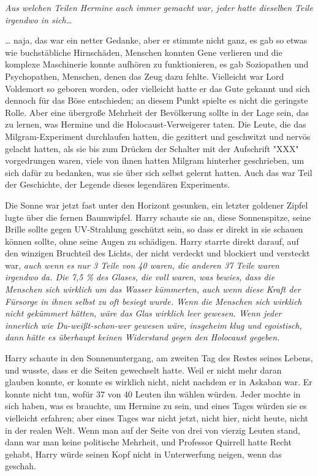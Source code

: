 {\emph{Aus welchen Teilen Hermine auch immer gemacht war, jeder hatte dieselben Teile irgendwo in sich…}

… naja, das war ein netter Gedanke, aber er stimmte nicht ganz, es gab so etwas wie buchstäbliche Hirnschäden, Menschen konnten Gene verlieren und die komplexe Maschinerie konnte aufhören zu funktionieren, es gab Soziopathen und Psychopathen, Menschen, denen das Zeug dazu fehlte. Vielleicht war Lord Voldemort so geboren worden, oder vielleicht hatte er das Gute gekannt und sich dennoch für das Böse entschieden; an diesem Punkt spielte es nicht die geringste Rolle. Aber eine übergroße Mehrheit der Bevölkerung sollte in der Lage sein, das zu lernen, was Hermine und die Holocaust-Verweigerer taten. Die Leute, die das Milgram-Experiment durchlaufen hatten, die gezittert und geschwitzt und nervös gelacht hatten, als sie bis zum Drücken der Schalter mit der Aufschrift "XXX" vorgedrungen waren, viele von ihnen hatten Milgram hinterher geschrieben, um sich dafür zu bedanken, was sie über sich selbst gelernt hatten. Auch das war Teil der Geschichte, der Legende dieses legendären Experiments.

Die Sonne war jetzt fast unter den Horizont gesunken, ein letzter goldener Zipfel lugte über die fernen Baumwipfel. Harry schaute sie an, diese Sonnenspitze, seine Brille sollte gegen UV-Strahlung geschützt sein, so dass er direkt in sie schauen können sollte, ohne seine Augen zu schädigen. Harry starrte direkt darauf, auf den winzigen Bruchteil des Lichts, der nicht verdeckt und blockiert und versteckt war, \emph{auch wenn es nur 3 Teile von 40 waren, die anderen 37 Teile waren irgendwo da. Die 7,5 \% des Glases, die voll waren, was bewies, dass die Menschen sich wirklich um das Wasser kümmerten, auch wenn diese Kraft der Fürsorge in ihnen selbst zu oft besiegt wurde. Wenn die Menschen sich wirklich nicht gekümmert hätten, wäre das Glas wirklich leer gewesen. Wenn jeder innerlich wie Du-weißt-schon-wer gewesen wäre, insgeheim klug und egoistisch, dann hätte es überhaupt keinen Widerstand gegen den Holocaust gegeben.}

Harry schaute in den Sonnenuntergang, am zweiten Tag des Restes seines Lebens, und wusste, dass er die Seiten gewechselt hatte. Weil er nicht mehr daran glauben konnte, er konnte es wirklich nicht, nicht nachdem er in Askaban war. Er konnte nicht tun, wofür 37 von 40 Leuten ihn wählen würden. Jeder mochte in sich haben, was es brauchte, um Hermine zu sein, und eines Tages würden sie es vielleicht erfahren; aber eines Tages war nicht jetzt, nicht hier, nicht heute, nicht in der realen Welt. Wenn man auf der Seite von drei von vierzig Leuten stand, dann war man keine politische Mehrheit, und Professor Quirrell hatte Recht gehabt, Harry würde seinen Kopf nicht in Unterwerfung neigen, wenn das geschah.

}
